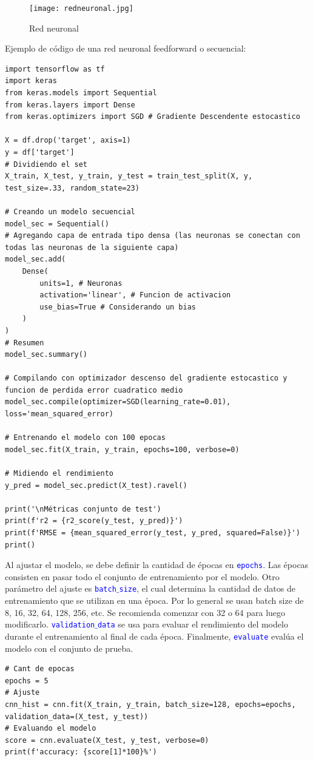 \documentclass[a4paper, 12pt]{book}
\begin{document}
\begin{figure}[H] 
	\centering 
	\texttt{[image: redneuronal.jpg]}
	\caption{Red neuronal}
\end{figure}

Ejemplo de código de una red neuronal feedforward o secuencial:
\begin{verbatim}
import tensorflow as tf
import keras
from keras.models import Sequential
from keras.layers import Dense
from keras.optimizers import SGD # Gradiente Descendente estocastico

X = df.drop('target', axis=1)
y = df['target']
# Dividiendo el set
X_train, X_test, y_train, y_test = train_test_split(X, y, test_size=.33, random_state=23)

# Creando un modelo secuencial
model_sec = Sequential()
# Agregando capa de entrada tipo densa (las neuronas se conectan con todas las neuronas de la siguiente capa)
model_sec.add(
	Dense(
		units=1, # Neuronas
		activation='linear', # Funcion de activacion
		use_bias=True # Considerando un bias
	)
)
# Resumen
model_sec.summary()

# Compilando con optimizador descenso del gradiente estocastico y funcion de perdida error cuadratico medio 
model_sec.compile(optimizer=SGD(learning_rate=0.01), loss='mean_squared_error)

# Entrenando el modelo con 100 epocas
model_sec.fit(X_train, y_train, epochs=100, verbose=0)

# Midiendo el rendimiento
y_pred = model_sec.predict(X_test).ravel()

print('\nMétricas conjunto de test')
print(f'r2 = {r2_score(y_test, y_pred)}')
print(f'RMSE = {mean_squared_error(y_test, y_pred, squared=False)}')
print()
\end{verbatim}

Al ajustar el modelo, se debe definir la cantidad de épocas en \texttt{\textcolor{blue}{epochs}}. Las épocas consisten en pasar todo el conjunto de entrenamiento por el modelo. Otro parámetro del ajuste es \texttt{\textcolor{blue}{batch$\_$size}}, el cual determina la cantidad de datos de entrenamiento que se utilizan en una época. Por lo general se usan batch size de 8, 16, 32, 64, 128, 256, etc. Se recomienda comenzar con 32 o 64 para luego modificarlo. \texttt{\textcolor{blue}{validation$\_$data}} se usa para evaluar el rendimiento del modelo durante el entrenamiento al final de cada época. Finalmente, \texttt{\textcolor{blue}{evaluate}} evalúa el modelo con el conjunto de prueba.
\begin{verbatim}
# Cant de epocas
epochs = 5
# Ajuste
cnn_hist = cnn.fit(X_train, y_train, batch_size=128, epochs=epochs, validation_data=(X_test, y_test))
# Evaluando el modelo
score = cnn.evaluate(X_test, y_test, verbose=0)
print(f'accuracy: {score[1]*100}%')
\end{verbatim}
\end{document}
